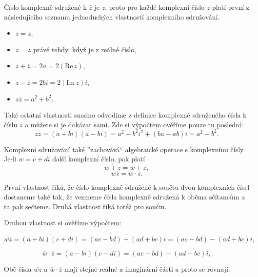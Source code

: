 \documentclass[12pt,a4paper]{report}
\begin{document}
	Číslo komplexně sdružené k $\overline {z}$ je $z$, proto pro každé komplexní číslo $z$ platí první z následujícího seznamu jednoduchých vlastností komplexního sdružování.
	
	\begin{itemize}
		\item $\overline {\overline {z}} = z,$
		\item $z = \overline {z}$ právě tehdy, když je z reálné číslo,
		\item $z + \overline {z} = 2a = 2(\text{Re}\,z)$,
		\item $z - \overline {z} = 2bi = 2(\text{Im}\,z)i$,
		\item $z\overline {z} = a^2 + b^2$.
	\end{itemize}
	
	Také ostatní vlastnosti snadno odvodíme z definice komplexně sdruženého čísla k číslu $z$ a můžete si je dokázat sami. Zde si výpočtem ověříme pouze tu poslední:
	\begin{equation}
		z{\overline z} = (a+bi)(a-bi) = a^2 - b^2i^2 + (ba-ab)i = a^2 + b^2.
	\end{equation}
	
	Komplexní sdružování také ”zachovává“ algebraické operace s komplexními čísly. Je-li $w = c + di$ další komplexní číslo, pak platí
	\begin{equation}
		\overline {w+z} = \overline {w} + \overline {z},
	\end{equation}
	\begin{equation}
		\overline {wz} = \overline {w}\cdot \overline {z}.
	\end{equation}
	
	První vlastnost říká, že číslo komplexně sdružené k součtu dvou komplexních čísel dostaneme také tak, že vezmeme čísla komplexně sdružená k oběma sčítancům a ta pak sečteme. Druhá vlastnost říká totéž pro součin.
	
	\newpage
	
	Druhou vlastnost si ověříme výpočtem:
	
	\begin{equation}
		\overline{wz} = \overline{(a+bi)(c+di)} = \overline{(ac-bd) + (ad+bc)i} = (ac-bd) - (ad+bc)i,
	\end{equation}
	
	\begin{equation}
		\overline{w} \cdot \overline{z} = (a-bi)(c-di) = (ac-bd) - (ad+bc)i,
	\end{equation}
	
	Obě čísla $\overline{wz}$ a $\overline{w} \cdot \overline{z}$ mají stejné reálné a imaginární části a proto se rovnají.
	
\end{document}
